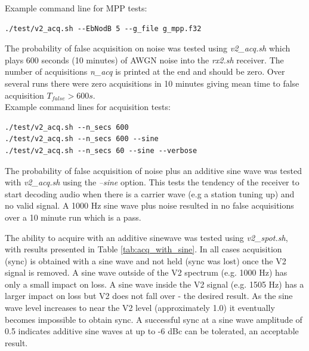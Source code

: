 \documentclass{article}
\begin{document}
\noindent Example command line for MPP tests:

\begin{verbatim}
./test/v2_acq.sh --EbNodB 5 --g_file g_mpp.f32
\end{verbatim}

The probability of false acquisition on noise was tested using \emph{v2\_acq.sh} which plays 600 seconds (10 minutes) of AWGN noise into the \emph{rx2.sh} receiver.  The number of acquisitions \emph{n\_acq} is printed at the end and should be zero. Over several runs there were zero acquisitions in 10 minutes giving mean time to false acquisition $T_{false} > 600 \si{s}$. \\

\noindent Example command lines for acquisition tests:

\begin{verbatim}
./test/v2_acq.sh --n_secs 600
./test/v2_acq.sh --n_secs 600 --sine
./test/v2_acq.sh --n_secs 60 --sine --verbose
\end{verbatim}

The probability of false acquisition of noise plus an additive sine wave was tested with \emph{v2\_acq.sh} using the \emph{--sine} option.  This tests the tendency of the receiver to start decoding audio when there is a carrier wave (e.g a station tuning up) and no valid signal.  A 1000 Hz sine wave plus noise resulted in no false acquisitions over a 10 minute run which is a pass.

The ability to acquire with an additive sinewave was tested using \emph{v2\_spot.sh}, with results presented in Table \ref{tab:acq_with_sine}.  In all cases acquisition (sync) is obtained with a sine wave and not held (sync was lost) once the V2 signal is removed. A sine wave outside of the V2 spectrum (e.g. 1000 Hz) has only a small impact on loss.  A sine wave inside the V2 signal (e.g. 1505 Hz) has a larger impact on loss but V2 does not fall over - the desired result.  As the sine wave level increases to near the V2 level (approximately 1.0) it eventually becomes impossible to obtain sync.  A successful sync at a sine wave amplitude of 0.5 indicates additive sine waves at up to -6 \si{dBc} can be tolerated, an acceptable result.
\end{document}
